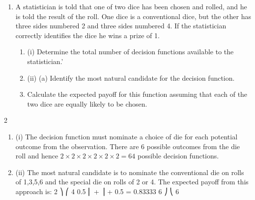 \documentclass[a4paper,12pt]{article}
\begin{document}
\begin{enumerate}


\item 
A statistician is told that one of two dice has been chosen and rolled, and he is told the result of the roll. One dice is a conventional dice, but the other has three sides numbered 2 and three sides numbered 4. If the statistician correctly identifies the dice he wins a prize of 1.
\begin{enumerate}
\item (i) Determine the total number of decision functions available to the statistician.'
\item 
(ii) (a)
Identify the most natural candidate for the decision function.
\item 
Calculate the expected payoff for this function assuming that each of
the two dice are equally likely to be chosen.
\end{enumerate}
\end{enumerate}
\newpage


2
\begin{enumerate}
\item (i)
The decision function must nominate a choice of die for each potential
outcome from the observation.
There are 6 possible outcomes from the die roll and hence $2 \times  2 \times  2 \times  2 \times  2 \times 
2 = 64$ possible decision functions.
\item (ii)
The most natural candidate is to nominate the conventional die on rolls of
1,3,5,6 and the special die on rolls of 2 or 4.
The expected payoff from this approach is:
2 ⎞
⎛ 4
0.5 \times  ⎜  +  ⎟ + 0.5  = 0.83333
6 ⎠
⎝ 6
\end{enumerate}
\end{document}
